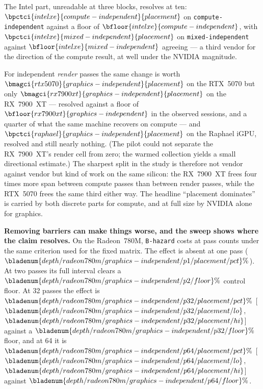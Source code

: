 \documentclass[10pt,twocolumn]{article}
\begin{document}
The Intel part, unreadable at three blocks, resolves at ten:
$\bpctci{intelxe}{compute-independent}{placement}$ on
\texttt{compute-independent} against a floor of
$\bfloor{intelxe}{compute-independent}$, with
$\bpctci{intelxe}{mixed-independent}{placement}$ on
\texttt{mixed-independent} against $\bfloor{intelxe}{mixed-independent}$
agreeing --- a third vendor for the direction of the compute result, at well
under the NVIDIA magnitude.

For independent \emph{render} passes the same change is worth
$\bmagci{rtx5070}{graphics-independent}{placement}$ on the RTX~5070 but only
$\bmagci{rx7900xt}{graphics-independent}{placement}$ on the RX~7900~XT ---
resolved against a floor of $\bfloor{rx7900xt}{graphics-independent}$ in the
observed sessions, and a quarter of what the same machine recovers on compute
--- and
$\bpctci{raphael}{graphics-independent}{placement}$ on the Raphael iGPU,
resolved and still nearly nothing. (The pilot could not separate the
RX~7900~XT's render cell from zero; the warmed collection yields a small
directional estimate.) The sharpest split in
the study is therefore not vendor against vendor but kind of work on the same
silicon: the RX~7900~XT frees four times more span between compute passes than
between render passes, while the RTX~5070 frees the same third either way. The
headline ``placement dominates'' is carried by both discrete parts for
compute, and at full size by NVIDIA alone for graphics.

\textbf{Removing barriers can make things worse, and the sweep shows where the
claim resolves.} On the Radeon~780M, \texttt{B-hazard} costs at
pass counts under the same criterion used for the fixed matrix. The effect is
absent at one pass
($\bladenum{depth/radeon780m/graphics-independent/p1/placement/pct}\%$).
At two passes its full interval clears a
$\bladenum{depth/radeon780m/graphics-independent/p2/floor}\%$ control floor.
At 32 passes the effect is
$\bladenum{depth/radeon780m/graphics-independent/p32/placement/pct}\%$
[$\bladenum{depth/radeon780m/graphics-independent/p32/placement/lo}$,
$\bladenum{depth/radeon780m/graphics-independent/p32/placement/hi}$] against
a $\bladenum{depth/radeon780m/graphics-independent/p32/floor}\%$ floor, and at
64 it is
$\bladenum{depth/radeon780m/graphics-independent/p64/placement/pct}\%$
[$\bladenum{depth/radeon780m/graphics-independent/p64/placement/lo}$,
$\bladenum{depth/radeon780m/graphics-independent/p64/placement/hi}$] against
$\bladenum{depth/radeon780m/graphics-independent/p64/floor}\%$.
\end{document}
